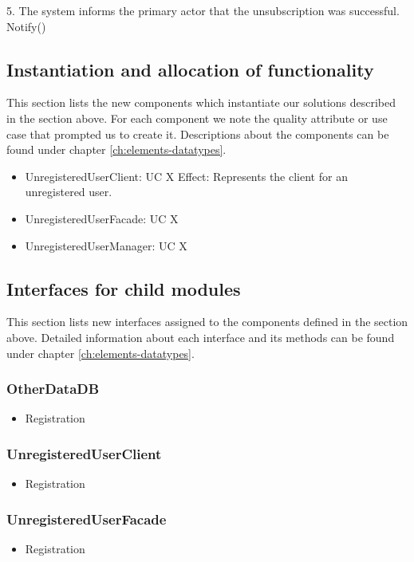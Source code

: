 {{{{{{{{{{{{{{        5. The system informs the primary actor that the unsubscription was successful.
            Notify()


\subsection{Instantiation and allocation of functionality}
    This section lists the new components which instantiate our solutions
    described in the section above. For each component we note the quality
    attribute or use case that prompted us to create it. Descriptions about
    the components can be found under chapter \ref{ch:elements-datatypes}. \\

    \begin{itemize}
        \item UnregisteredUserClient: UC X
              Effect: Represents the client for an unregistered user.
        \item UnregisteredUserFacade: UC X
        \item UnregisteredUserManager: UC X
    \end{itemize}


\subsection{Interfaces for child modules}
    This section lists new interfaces assigned to the components defined
    in the section above. Detailed information about each interface and
    its methods can be found under chapter \ref{ch:elements-datatypes}. \\

    \subsubsection{OtherDataDB}
        \begin{itemize}
            \item Registration
        \end{itemize}
    \subsubsection{UnregisteredUserClient}
        \begin{itemize}
            \item Registration
        \end{itemize}
    \subsubsection{UnregisteredUserFacade}
        \begin{itemize}
            \item Registration
        \end{itemize}
}}}}}}}}}}}}}}
